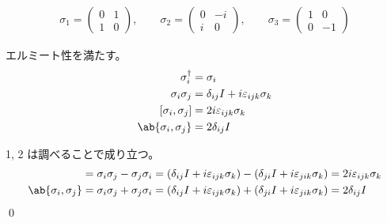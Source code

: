 \documentclass[uplatex,dvipdfmx,a4paper,11pt]{jlreq}
\makeatletter
\numberwithin{equation}{section}
\theoremstyle{definition}
\renewenvironment{proof}[1][\proofname]{\par
  \normalfont
  \topsep6\p@\@plus6\p@ \trivlist
  \item[\hskip\labelsep{\bfseries #1}\@addpunct{\bfseries}]\ignorespaces\quad\par
}{%
  \qed\endtrivlist\@endpefalse
}
\renewcommand\proofname{証明}
\makeatother
\begin{document}
\begin{definition}[パウリ行列]
  \begin{align}
    \sigma_1 = \begin{pmatrix}
                 0 & 1 \\
                 1 & 0
               \end{pmatrix}, \qquad
    \sigma_2 = \begin{pmatrix}
                 0 & -i \\
                 i & 0
               \end{pmatrix}, \qquad
    \sigma_3 = \begin{pmatrix}
                 1 & 0  \\
                 0 & -1
               \end{pmatrix}
  \end{align}
\end{definition}

\begin{proposition}[パウリ行列の性質]
  エルミート性を満たす。
  \begin{align}
    \sigma_i^\dagger          & = \sigma_i                                  \\
    \sigma_i\sigma_j          & = \delta_{ij}I + i\varepsilon_{ijk}\sigma_k \\
    [\sigma_i, \sigma_j]      & = 2i\varepsilon_{ijk}\sigma_k               \\
    \ab\{\sigma_i, \sigma_j\} & = 2\delta_{ij}I
  \end{align}
\end{proposition}
\begin{proof}
  1, 2 は調べることで成り立つ。
  \begin{align}
    [\sigma_i, \sigma_j]      & = \sigma_i\sigma_j - \sigma_j\sigma_i = (\delta_{ij}I + i\varepsilon_{ijk}\sigma_k) - (\delta_{ji}I + i\varepsilon_{jik}\sigma_k) = 2i\varepsilon_{ijk}\sigma_k \\
    \ab\{\sigma_i, \sigma_j\} & = \sigma_i\sigma_j + \sigma_j\sigma_i = (\delta_{ij}I + i\varepsilon_{ijk}\sigma_k) + (\delta_{ji}I + i\varepsilon_{jik}\sigma_k) = 2\delta_{ij}I
  \end{align}
\end{proof}
\end{document}
